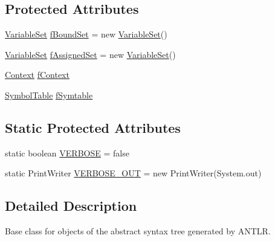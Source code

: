 \subsection*{Protected Attributes}
\begin{DoxyCompactItemize}
\item 
\hyperlink{classorg_1_1tzi_1_1use_1_1util_1_1soil_1_1_variable_set}{Variable\-Set} \hyperlink{classorg_1_1tzi_1_1use_1_1parser_1_1soil_1_1ast_1_1_a_s_t_statement_a9f4ac22b545acfcaf1cd6cb2c22b6ab0}{f\-Bound\-Set} = new \hyperlink{classorg_1_1tzi_1_1use_1_1util_1_1soil_1_1_variable_set}{Variable\-Set}()
\item 
\hyperlink{classorg_1_1tzi_1_1use_1_1util_1_1soil_1_1_variable_set}{Variable\-Set} \hyperlink{classorg_1_1tzi_1_1use_1_1parser_1_1soil_1_1ast_1_1_a_s_t_statement_a78d5d44f790b64961430b132f030382e}{f\-Assigned\-Set} = new \hyperlink{classorg_1_1tzi_1_1use_1_1util_1_1soil_1_1_variable_set}{Variable\-Set}()
\item 
\hyperlink{classorg_1_1tzi_1_1use_1_1parser_1_1_context}{Context} \hyperlink{classorg_1_1tzi_1_1use_1_1parser_1_1soil_1_1ast_1_1_a_s_t_statement_ae3cdc8377ff063577f83a0a293b816c9}{f\-Context}
\item 
\hyperlink{classorg_1_1tzi_1_1use_1_1util_1_1soil_1_1_symbol_table}{Symbol\-Table} \hyperlink{classorg_1_1tzi_1_1use_1_1parser_1_1soil_1_1ast_1_1_a_s_t_statement_ac5ea093114a0f21061f5105e5d55c631}{f\-Symtable}
\end{DoxyCompactItemize}
\subsection*{Static Protected Attributes}
\begin{DoxyCompactItemize}
\item 
static boolean \hyperlink{classorg_1_1tzi_1_1use_1_1parser_1_1soil_1_1ast_1_1_a_s_t_statement_a47c684aa3b956c5a1b5479d7769e6c8c}{V\-E\-R\-B\-O\-S\-E} = false
\item 
static Print\-Writer \hyperlink{classorg_1_1tzi_1_1use_1_1parser_1_1soil_1_1ast_1_1_a_s_t_statement_a40a89b5ad699892dc55b2e01d5074386}{V\-E\-R\-B\-O\-S\-E\-\_\-\-O\-U\-T} = new Print\-Writer(System.\-out)
\end{DoxyCompactItemize}


\subsection{Detailed Description}
Base class for objects of the abstract syntax tree generated by A\-N\-T\-L\-R. 

